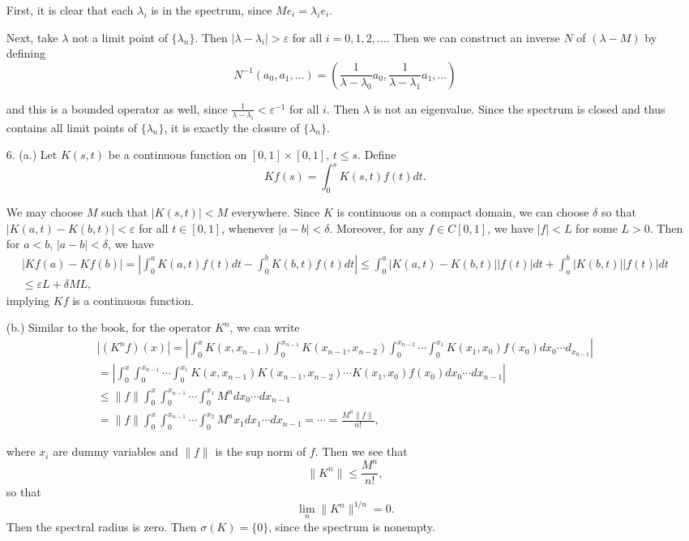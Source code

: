 \documentclass[11pt, reqno]{article}
\theoremstyle{plain}
\theoremstyle{definition}
\theoremstyle{remark}
\renewcommand{\epsilon}{\varepsilon}
\begin{document}
\begin{enumerate}
    First, it is clear that each $\lambda_i$ is in the spectrum, since $M e_i = \lambda_i e_i$.

    Next, take $\lambda$ not a limit point of $\{\lambda_n\}$. Then $|\lambda - \lambda_i| > \epsilon$
    for all $i = 0, 1,2, \dots$. Then we can construct an inverse $N$ of $(\lambda - M)$ by defining
    \[
        N^{-1}(a_0, a_1, \dots) = \left(\frac{1}{\lambda - \lambda_0}a_0, \frac{1}{\lambda - \lambda_1}a_1, \dots\right)
    \]

    and this is a bounded operator as well, since $\frac{1}{\lambda - \lambda_i} < \epsilon^{-1}$
    for all $i$. Then $\lambda$ is not an eigenvalue. Since the spectrum is closed
    and thus contains all limit points of $\{\lambda_n\}$, it is exactly
    the closure of $\{\lambda_n\}$.

    \item[6.] (a.) Let $K(s,t)$ be a continuous function on $[0,1]\times[0,1]$, $t \leq s$. Define
    \[
        Kf(s) = \int_0^s K(s,t)f(t)dt.
    \]

    We may choose $M$ such that $|K(s,t)| < M$ everywhere.
    Since $K$ is continuous on a compact domain, we can choose $\delta$ so that $|K(a,t) - K(b,t)| < \epsilon$  
    for all $t \in [0,1]$, whenever $|a-b| < \delta$. Moreover, for any $f \in C[0,1]$, 
    we have $|f|< L$ for some $L > 0$. Then for $a < b$, $|a-b|< \delta$, we have
    \begin{align*}
        \left| Kf(a) - Kf(b)\right| = \left| \int_0^a K(a,t)f(t)dt - \int_0^b K(b,t)f(t)dt\right|
        \leq \int_0^a |K(a,t) - K(b,t)||f(t)|dt + \int_a^b |K(b,t)||f(t)|dt\\
        \leq \epsilon L + \delta M L,
    \end{align*}
    implying $Kf$ is a continuous function.

    (b.) Similar to the book, for the operator $K^n$, we can write
    \begin{align*}
        |(K^n f)(x)| = \left|\int_0^x K(x,x_{n-1}) \int_0^{x_{n-1}} K(x_{n-1}, x_{n-2})
        \int_0^{x_{n-2}} \cdots \int_0^{x_1} K(x_1, x_0)f(x_0)dx_{0} \cdots d_{x_{n-1}}\right|\\
        = \left| \int_0^{x}\int_0^{x_{n-1}} \cdots \int_0^{x_1}K(x, x_{n-1})K(x_{n-1}, x_{n-2})
        \cdots K(x_1, x_0)f(x_0)dx_0 \cdots dx_{n-1}\right|\\
        \leq \|f\| \int_0^{x}\int_0^{x_{n-1}} \cdots \int_0^{x_1} M^n dx_0 \cdots dx_{n-1}\\
        = \|f\| \int_0^{x}\int_0^{x_{n-1}} \cdots \int_0^{x_2}M^n x_1 dx_1 \cdots dx_{n-1}
        = \cdots = \frac{M^n \|f\|}{n!},
    \end{align*}

    where $x_i$ are dummy variables and $\|f\|$ is the sup norm of $f$. Then we see that 
    \[
        \|K^n\| \leq \frac{M^n}{n!},
    \]
    so that 
    \[
        \lim_{n} \|K^n\|^{1/n} = 0.
    \]
    Then the spectral radius is zero. Then $\sigma(K) = \{0\}$, since the spectrum is nonempty.

\end{enumerate}
\end{document}
